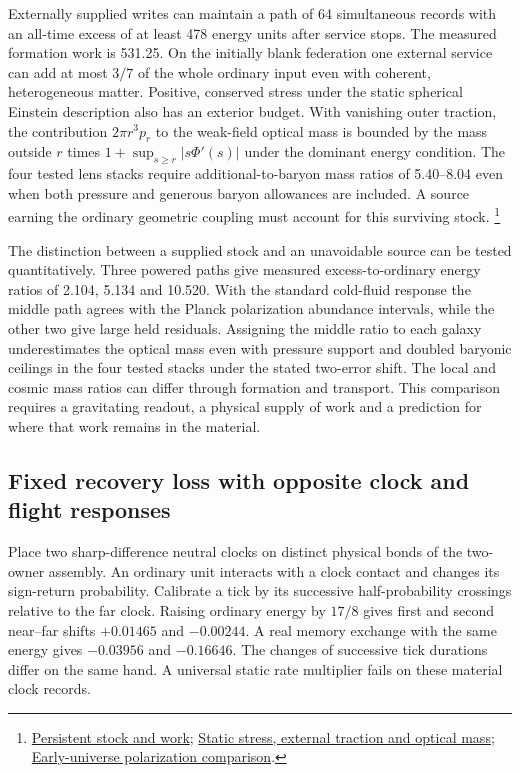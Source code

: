 \documentclass[11pt]{article}
\begin{document}
Externally supplied writes can maintain a path of 64 simultaneous records
with an all-time excess of at least 478 energy units after service stops.
The measured formation work is 531.25. On the initially blank federation
one external service can add at most $3/7$ of the whole ordinary input
even with coherent, heterogeneous matter. Positive, conserved stress
under the static spherical Einstein description also has an exterior
budget. With vanishing outer traction, the contribution $2\pi r^3p_r$
to the weak-field optical mass is bounded by the mass outside $r$
times $1+\sup_{s\ge r}|s\Phi'(s)|$ under the dominant energy condition.
The four tested lens stacks require additional-to-baryon mass ratios of
5.40--8.04 even when both pressure and generous baryon allowances are
included. A source earning the ordinary geometric coupling must
account for this surviving stock.%
\footnote{\href{https://github.com/FloatingPragma/observer-patch-holography/tree/main/model/experiments/interval_echo_shell_flux/product_address/green_response/material_recoil/overlap_source/native_boundary/stock}{Persistent stock and work};
\href{https://github.com/FloatingPragma/observer-patch-holography/tree/main/code/cosmology/rar_deep_regime/compensation/pressure_budget}{Static stress, external traction and optical mass};
\href{https://github.com/FloatingPragma/observer-patch-holography/tree/main/code/cosmology/cold_acoustic_polarization}{Early-universe polarization comparison}.}

The distinction between a supplied stock and an unavoidable source can
be tested quantitatively. Three powered paths give measured excess-to-ordinary
energy ratios of 2.104, 5.134 and 10.520. With the standard cold-fluid
response the middle path agrees with the Planck polarization abundance
intervals, while the other two give large held residuals. Assigning the
middle ratio to each galaxy underestimates the optical mass even with
pressure support and doubled baryonic ceilings in the four tested stacks
under the stated two-error shift. The local and cosmic mass ratios can
differ through formation and transport. This comparison requires a
gravitating readout, a physical supply of work and a prediction for where
that work remains in the material.

\subsection{Fixed recovery loss with opposite clock and flight responses}

Place two sharp-difference neutral clocks on distinct physical bonds of the
two-owner assembly. An ordinary unit interacts with a clock contact and
changes its sign-return probability. Calibrate a tick by its successive
half-probability crossings relative to the far clock. Raising ordinary
energy by $17/8$ gives first and second near--far shifts $+0.01465$ and
$-0.00244$. A real memory exchange with the same energy gives $-0.03956$
and $-0.16646$. The changes of successive tick durations differ on the
same hand. A universal static rate multiplier fails on these material
clock records.
\end{document}
